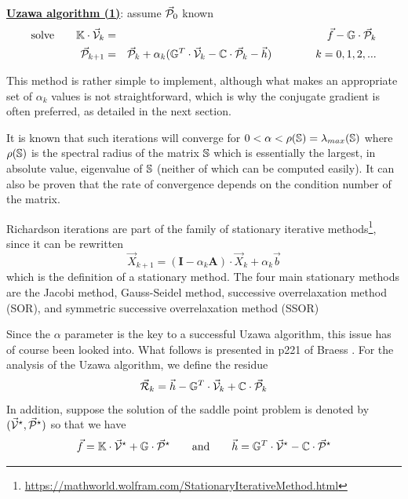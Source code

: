 \begin{mdframed}[backgroundcolor=blue!5]
\underline{\bf Uzawa algorithm (1)}: assume $\vec{\cal P}_0$ known
\begin{eqnarray}
\text{solve} \qquad \mathbb{K} \cdot \vec{\cal V}_k &=& \vec f - \mathbb{G}\cdot \vec {\cal P}_{k} \\
\vec{\cal P}_{k+1} &=& 
\vec{\cal P}_{k}  + \alpha_k (\mathbb{G}^T\cdot \vec{\cal V}_k  -{\mathbb{C}} \cdot \vec{\cal P}_{k} -\vec h)
\quad
\quad
\quad
\quad
k=0,1,2, ... \label{uzaa2}
\end{eqnarray}
\end{mdframed}


This method is rather simple to implement, although
what makes an appropriate set of $\alpha_k$ values is not straightforward, which is why 
the conjugate gradient is often preferred, as detailed in the next section. 

It is known that such iterations will converge for $0< \alpha < \rho({\mathbb{S}})= \lambda_{max}({\mathbb{S}})$ 
where $\rho({\mathbb{S}})$ is the spectral radius of the matrix ${\mathbb{S}}$
which is essentially the largest, in absolute value, eigenvalue of ${\mathbb{S}}$ (neither of which 
can be computed easily).  
It can also be proven that the rate of convergence depends on the condition number of the matrix.

Richardson iterations are part of the family of stationary iterative 
methods\footnote{\url{https://mathworld.wolfram.com/StationaryIterativeMethod.html}}, 
since it can be rewritten 
\begin{equation}
{\vec X}_{k+1} = ({\bm I} - \alpha_k {\bm A} ) \cdot {\vec X}_k + \alpha_k {\vec b}
\end{equation}
which is the definition of a stationary method. 
The four main stationary methods are the Jacobi method, 
Gauss-Seidel method, successive overrelaxation method (SOR), 
and symmetric successive overrelaxation method (SSOR)


Since the $\alpha$ parameter is the key to a successful Uzawa algorithm, 
this issue has of course been looked into. What follows is 
presented in p221 of Braess \cite{braess}.
For the analysis of the Uzawa algorithm, we define the residue
\[
\vec {\cal R}_k = \vec h - \mathbb{G}^T \cdot \vec{\cal V}_k  +{\mathbb{C}} \cdot \vec{\cal P}_{k}
\]
In addition, suppose the solution of the saddle point problem is denoted
by $(\vec{\cal V}^\star,\vec{\cal P}^\star)$ so that we have
\[
\vec{f} = {\mathbb{K}} \cdot \vec{\cal V}^\star + {\mathbb{G}} \cdot \vec{\cal P}^\star
\qquad
{\rm and}
\qquad
\vec{h} = {\mathbb{G}}^T \cdot \vec{\cal V}^\star - {\mathbb{C}} \cdot \vec{\cal P}^\star 
\]

